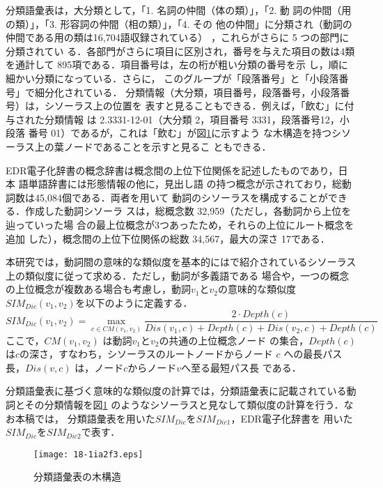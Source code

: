 \documentclass[japanese]{jnlp_1.4}
\begin{document}
\begin{itemize}
分類語彙表は，大分類として，「1. 名詞の仲間（体の類）」，「2. 動
	   詞の仲間（用の類）」，「3. 形容詞の仲間（相の類）」，「4. その
	   他の仲間」に分類され（動詞の仲間である用の類は16,704語収録されている）
，これらがさらに 5 つの部門に分類されてい
	   る．各部門がさらに項目に区別され，番号を与えた項目の数は4類
	   を通計して
895項である．項目番号は，左の桁が粗い分類の番号を示
	   し，順に細かい分類になっている．さらに，
このグループが「段落番号」と「小段落番号」で細分化されている．
分類情報（大分類，項目番号，段落番号，小段落番号）は，シソーラス上の位置を
	   表すと見ることもできる．例えば，「飲む」に付与された分類情報
	   は 2.3331-12-01（大分類 2，項目番号 3331，段落番号12，小段落
	   番号 01）であるが，これは「飲む」が図\ref{図:Tree}に示すよう
	   な木構造を持つシソーラス上の葉ノードであることを示すと見るこ
	   ともできる．

EDR電子化辞書の概念辞書は概念間の上位下位関係を記述したものであり，日本
	   語単語辞書には形態情報の他に，見出し語
	   の持つ概念が示されており，総動詞数は45,084個である．両者を用いて
	   動詞のシソーラスを構成することができる．作成した動詞シソーラ
	   スは，総概念数 32,959（ただし，各動詞から上位を辿っていった場
	   合の最上位概念が3つあったため，それらの上位にルート概念を追加
	   した），概念間の上位下位関係の総数 34,567，最大の深さ 17である．

本研究では，動詞間の意味的な類似度を基本的には\cite{長尾}で紹介されているシソーラス上の類似度に従って求める．ただし，動詞が多義語である
場合や，一つの概念の上位概念が複数ある場合も考慮し，動詞$v_{1}$と$v_{2}$の意味的な類似度$SIM_{Dic}(v_{1},v_{2})$を以下のように定義する．
\[
SIM_{Dic}(v_{1},v_{2})
 =\max_{c \in C\!M(v_{1},v_{2})}\frac{2 \cdot Depth(c)}{Dis(v_{1},c)+Depth(c)+Dis(v_{2},c)+Depth(c)}
\]
ここで，$C\!M(v_{1},v_{2})$ は動詞$v_{1}$と$v_{2}$の共通の上位概念ノード
の集合，\textbf{$Depth(c)$}は$c$の深さ，すなわち，シソーラスのルートノードからノード
$c$ への最長パス長，\textbf{$Dis(v,c)$} は，ノード$c$からノード$v$へ至る最短パス長
	   である．

分類語彙表に基づく意味的な類似度の計算では，分類語彙表に記載されている動詞とその分類情報を図\ref{図:Tree}
	   のようなシソーラスと見なして類似度の計算を行う．なお本稿では，
	   分類語彙表を用いた$SIM_{Dic}$を$SIM_{Dic1}$，EDR電子化辞書を
	   用いた$SIM_{Dic}$を$SIM_{Dic2}$で表す．
\end{itemize}

\begin{figure}[t]
\begin{center}
\texttt{[image: 18-1ia2f3.eps]}
\end{center}
\caption{分類語彙表の木構造} \label{図:Tree}
\end{figure}
\end{document}
